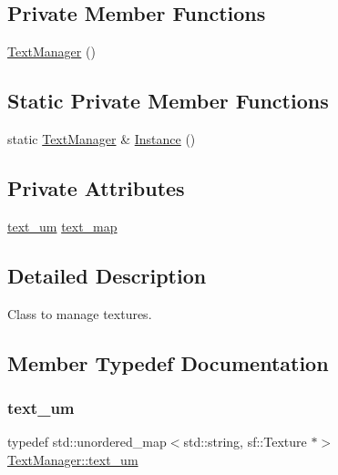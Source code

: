 \subsection*{Private Member Functions}
\begin{DoxyCompactItemize}
\item 
\mbox{\hyperlink{class_text_manager_a10708b85d4ba3241732df21961f1b4a4}{Text\+Manager}} ()
\end{DoxyCompactItemize}
\subsection*{Static Private Member Functions}
\begin{DoxyCompactItemize}
\item 
static \mbox{\hyperlink{class_text_manager}{Text\+Manager}} \& \mbox{\hyperlink{class_text_manager_aef625a6be5a7239925609ba62acdf1a9}{Instance}} ()
\end{DoxyCompactItemize}
\subsection*{Private Attributes}
\begin{DoxyCompactItemize}
\item 
\mbox{\hyperlink{class_text_manager_ab982469e25633e1e17ef8fffa96712ac}{text\+\_\+um}} \mbox{\hyperlink{class_text_manager_af04fbfe91b649d756db506ed6e3ba8a9}{text\+\_\+map}}
\end{DoxyCompactItemize}


\subsection{Detailed Description}
Class to manage textures. 

\subsection{Member Typedef Documentation}
\mbox{\label{class_text_manager_ab982469e25633e1e17ef8fffa96712ac}} 
\subsubsection{\texorpdfstring{text\_um}{text\_um}}
{\footnotesize\ttfamily typedef std\+::unordered\+\_\+map$<$std\+::string, sf\+::\+Texture $\ast$$>$ \mbox{\hyperlink{class_text_manager_ab982469e25633e1e17ef8fffa96712ac}{Text\+Manager\+::text\+\_\+um}}}

